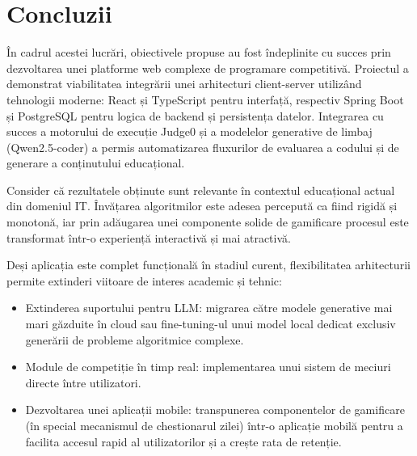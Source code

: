 \chapter{Concluzii}

În cadrul acestei lucrări, obiectivele propuse au fost îndeplinite cu succes prin dezvoltarea unei platforme web complexe de programare competitivă. Proiectul a demonstrat viabilitatea integrării unei arhitecturi client-server utilizând tehnologii moderne: React și TypeScript pentru interfață, respectiv Spring Boot și PostgreSQL pentru logica de backend și persistența datelor. Integrarea cu succes a motorului de execuție Judge0 și a modelelor generative de limbaj (Qwen2.5-coder) a permis automatizarea fluxurilor de evaluarea a codului și de generare a conținutului educațional. 

Consider că rezultatele obținute sunt relevante în contextul educațional actual din domeniul IT. Învățarea algoritmilor este adesea percepută ca fiind rigidă și monotonă, iar prin adăugarea unei componente solide de gamificare procesul este transformat într-o experiență interactivă și mai atractivă. 

Deși aplicația este complet funcțională în stadiul curent, flexibilitatea arhitecturii permite extinderi viitoare de interes academic și tehnic:

\begin{itemize}
    \item Extinderea suportului pentru LLM: migrarea către modele generative mai mari găzduite în cloud sau fine-tuning-ul unui model local dedicat exclusiv generării de probleme algoritmice complexe.
    \item Module de competiție în timp real: implementarea unui sistem de meciuri directe între utilizatori.
    \item Dezvoltarea unei aplicații mobile: transpunerea componentelor de gamificare (în special mecanismul de chestionarul zilei) într-o aplicație mobilă pentru a facilita accesul rapid al utilizatorilor și a crește rata de retenție.
\end{itemize}